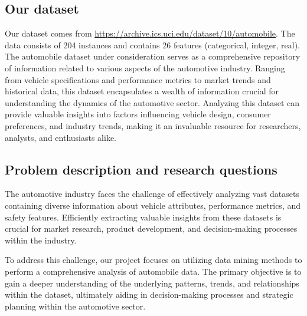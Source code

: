 \documentclass[11pt,a4paper]{article}\usepackage[]{graphicx}\usepackage[]{xcolor}
\begin{document}
	\subsection{Our dataset}
	Our dataset comes from \url{https://archive.ics.uci.edu/dataset/10/automobile}. The data consists of 204 instances and contains 26 features (categorical, integer, real). The automobile dataset under consideration serves as a comprehensive repository of information related to various aspects of the automotive industry. Ranging from vehicle specifications and performance metrics to market trends and historical data, this dataset encapsulates a wealth of information crucial for understanding the dynamics of the automotive sector. Analyzing this dataset can provide valuable insights into factors influencing vehicle design, consumer preferences, and industry trends, making it an invaluable resource for researchers, analysts, and enthusiasts alike.
	
	\subsection{Problem description and research questions}
	
The automotive industry faces the challenge of effectively analyzing vast datasets containing diverse information about vehicle attributes, performance metrics, and safety features. Efficiently extracting valuable insights from these datasets is crucial for market research, product development, and decision-making processes within the industry.

To address this challenge, our project focuses on utilizing data mining methods to perform a comprehensive analysis of automobile data. The primary objective is to gain a deeper understanding of the underlying patterns, trends, and relationships within the dataset, ultimately aiding in decision-making processes and strategic planning within the automotive sector.
\end{document}
